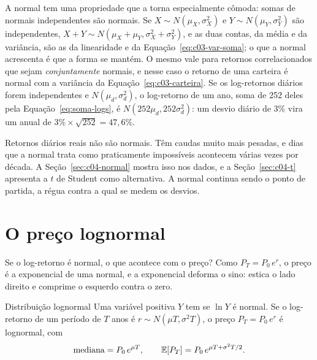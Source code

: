 A normal tem uma propriedade que a torna especialmente cômoda: somas de normais independentes são normais. Se $X \sim N(\mu_X, \sigma_X^2)$ e $Y \sim N(\mu_Y, \sigma_Y^2)$ são independentes, $X + Y \sim N(\mu_X + \mu_Y, \sigma_X^2 + \sigma_Y^2)$, e as duas contas, da média e da variância, são as da linearidade e da Equação~\eqref{eq:c03-var-soma}; o que a normal acrescenta é que a forma se mantém. O mesmo vale para retornos correlacionados que sejam \emph{conjuntamente} normais, e nesse caso o retorno de uma carteira é normal com a variância da Equação~\eqref{eq:c03-carteira}. Se os log-retornos diários forem independentes e $N(\mu_d, \sigma_d^2)$, o log-retorno de um ano, soma de 252 deles pela Equação~\eqref{eq:soma-logs}, é $N(252\mu_d, 252\sigma_d^2)$: um desvio diário de 3\% vira um anual de $3\% \times \sqrt{252} = 47,6\%$.

Retornos diários reais não são normais. Têm caudas muito mais pesadas, e dias que a normal trata como praticamente impossíveis acontecem várias vezes por década. A Seção~\ref{sec:c04-normal} mostra isso nos dados, e a Seção~\ref{sec:c04-t} apresenta a $t$ de Student como alternativa. A normal continua sendo o ponto de partida, a régua contra a qual se medem os desvios.

\section{O preço lognormal}
\label{sec:c03-lognormal}

Se o log-retorno é normal, o que acontece com o preço? Como $P_T = P_0\,e^{r}$, o preço é a exponencial de uma normal, e a exponencial deforma o sino: estica o lado direito e comprime o esquerdo contra o zero.

\begin{definicao}{Distribuição lognormal}
Uma variável positiva $Y$ tem  se $\ln Y$ é normal. Se o log-retorno de um período de $T$ anos é $r \sim N(\mu T, \sigma^2 T)$, o preço $P_T = P_0\,e^r$ é lognormal, com
\begin{equation}
  \text{mediana} = P_0\,e^{\mu T} , \qquad \operatorname{\mathbb{E}}[P_T] = P_0\,e^{\mu T + \sigma^2 T/2} .
  \label{eq:c03-lognormal}
\end{equation}
\end{definicao}

